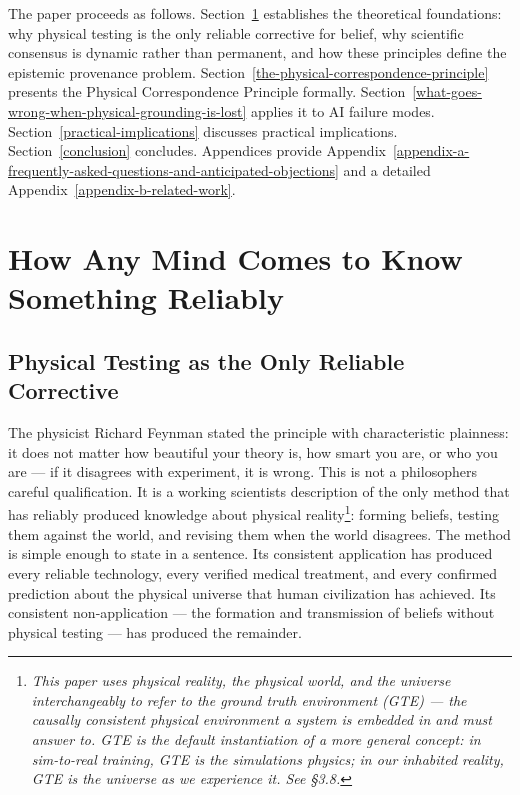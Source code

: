 \documentclass[12pt]{article}
\begin{document}
The paper proceeds as follows.
Section~\ref{how-any-mind-comes-to-know-something-reliably}
establishes the theoretical foundations: why physical testing is the
only reliable corrective for belief, why scientific consensus is dynamic
rather than permanent, and how these principles define the epistemic
provenance problem.
Section~\ref{the-physical-correspondence-principle}
presents the Physical Correspondence Principle formally.
Section~\ref{what-goes-wrong-when-physical-grounding-is-lost} applies it to AI failure modes.
Section~\ref{practical-implications} discusses practical
implications. Section~\ref{conclusion} concludes.
Appendices provide
Appendix~\ref{appendix-a-frequently-asked-questions-and-anticipated-objections} and a detailed
Appendix~\ref{appendix-b-related-work}.

\section{How Any Mind Comes to Know Something Reliably}\label{how-any-mind-comes-to-know-something-reliably}

\subsection{Physical Testing as the Only Reliable Corrective}\label{physical-testing-as-the-only-reliable-corrective}

The physicist Richard Feynman stated the principle with characteristic
plainness: it does not matter how beautiful your theory is, how smart
you are, or who you are --- if it disagrees with experiment, it is
wrong. This is not a philosopher\textquotesingle s careful
qualification. It is a working scientist\textquotesingle s description
of the only method that has reliably produced knowledge about physical
reality\footnote{\emph{This paper uses \textquotesingle physical
  reality\textquotesingle, \textquotesingle the physical
  world\textquotesingle, and \textquotesingle the
  universe\textquotesingle{} interchangeably to refer to the ground
  truth environment (GTE) --- the causally consistent physical
  environment a system is embedded in and must answer to. GTE is the
  default instantiation of a more general concept: in sim-to-real
  training, GTE is the simulation\textquotesingle s physics; in our
  inhabited reality, GTE is the universe as we experience it. See §3.8.}}:
forming beliefs, testing them against the world, and revising them when
the world disagrees. The method is simple enough to state in a sentence.
Its consistent application has produced every reliable technology, every
verified medical treatment, and every confirmed prediction about the
physical universe that human civilization has achieved. Its consistent
non-application --- the formation and transmission of beliefs without
physical testing --- has produced the remainder.
\end{document}
